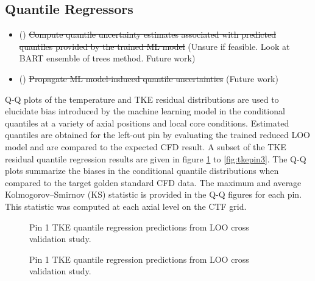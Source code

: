 \subsection{Quantile Regressors}

\begin{itemize}   
    \item (\xmark) \sout{Compute quantile uncertainty estimates associated with predicted quantiles provided by the trained ML model} (Unsure if feasible.  Look at BART ensemble of trees method. Future work)
    \item (\xmark) \sout{Propagate ML model-induced quantile uncertainties} (Future work)
\end{itemize}


Q-Q plots of the  temperature and TKE residual distributions are used to elucidate bias introduced by the machine learning model in the conditional quantiles at a variety of axial positions and local core conditions.  Estimated quantiles are obtained for the left-out pin by evaluating the trained reduced LOO model and are compared to the expected CFD result.
A subset of the TKE residual quantile regression results are given in figure \ref{fig:tkepin1} to \ref{fig:tkepin3}.  The Q-Q plots summarize the biases in the conditional quantile distributions when compared to the target golden standard CFD data.  The maximum and average Kolmogorov–Smirnov (KS) statistic is provided in the Q-Q figures for each pin.  This statistic was computed at each axial level on the CTF grid.

\begin{figure}[H]%
    \centering
    \qquad
    \caption[Q-Q LOO TKE pin 1 results.]{Pin 1 TKE quantile regression predictions from LOO cross validation study.}%
    \label{fig:tkepin1}%
\end{figure}

\begin{figure}[H]%
    \centering
    \qquad
    \caption[Q-Q LOO TKE pin 2 results.]{Pin 1 TKE quantile regression predictions from LOO cross validation study.}%
    \label{fig:tkepin2}%
\end{figure}

